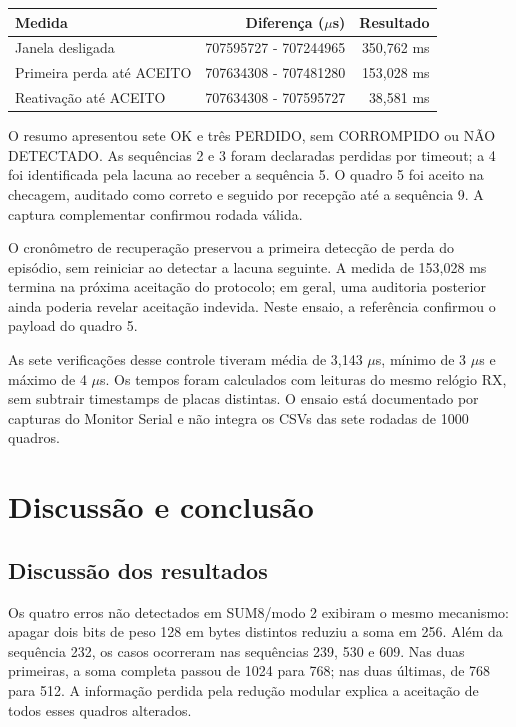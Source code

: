 \documentclass[12pt,a4paper]{article}
\begin{document}
\par\smallskip\noindent\begin{minipage}{\textwidth}\centering\small
{}
\begin{tabularx}{\textwidth}{@{}Y r r@{}}\toprule
\textbf{Medida} & \textbf{Diferença (\ensuremath{\mu}s)} & \textbf{Resultado}\\\midrule
Janela desligada & 707595727 - 707244965 & 350,762 ms\\
Primeira perda até ACEITO & 707634308 - 707481280 & 153,028 ms\\
Reativação até ACEITO & 707634308 - 707595727 & 38,581 ms\\
\bottomrule\end{tabularx}
\par{}\end{minipage}\par\smallskip

O resumo apresentou sete OK e três PERDIDO, sem CORROMPIDO ou NÃO DETECTADO. As sequências 2 e 3 foram declaradas perdidas por timeout; a 4 foi identificada pela lacuna ao receber a sequência 5. O quadro 5 foi aceito na checagem, auditado como correto e seguido por recepção até a sequência 9. A captura complementar confirmou rodada válida.

O cronômetro de recuperação preservou a primeira detecção de perda do episódio, sem reiniciar ao detectar a lacuna seguinte. A medida de 153,028 ms termina na próxima aceitação do protocolo; em geral, uma auditoria posterior ainda poderia revelar aceitação indevida. Neste ensaio, a referência confirmou o payload do quadro 5.

As sete verificações desse controle tiveram média de 3,143 \ensuremath{\mu}s, mínimo de 3 \ensuremath{\mu}s e máximo de 4 \ensuremath{\mu}s. Os tempos foram calculados com leituras do mesmo relógio RX, sem subtrair timestamps de placas distintas. O ensaio está documentado por capturas do Monitor Serial e não integra os CSVs das sete rodadas de 1000 quadros.

\FloatBarrier
\clearpage
\section{Discussão e conclusão}
\subsection{Discussão dos resultados}
Os quatro erros não detectados em SUM8/modo 2 exibiram o mesmo mecanismo: apagar dois bits de peso 128 em bytes distintos reduziu a soma em 256. Além da sequência 232, os casos ocorreram nas sequências 239, 530 e 609. Nas duas primeiras, a soma completa passou de 1024 para 768; nas duas últimas, de 768 para 512. A informação perdida pela redução modular explica a aceitação de todos esses quadros alterados.
\end{document}
